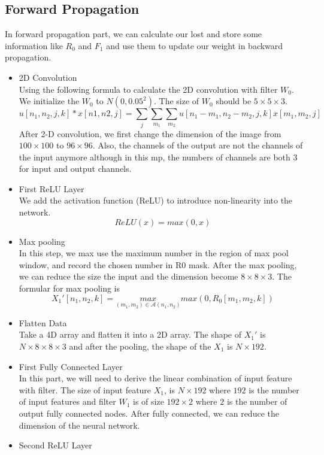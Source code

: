 \documentclass[12pt]{article}
\begin{document}
	\subsection*{Forward Propagation}
		In forward propagation part, we can calculate our lost and store some information like $R_0$ and $F_1$ and use them to update our weight in backward propagation.
		\begin{itemize}
  		\item 2D Convolution \\
			Using the following formula to calculate the 2D convolution with filter $W_0$. We initialize the $W_0$ to $N(0, 0.05^2)$. The size of $W_0$ should be $5 \times 5 \times 3$.
			$$u[n_1, n_2, j, k]*x[n1, n2, j] = \sum_j \sum_{m_1} \sum_{m_2} u[n_1-m_1, n_2-m_2, j, k]x[m_1, m_2, j]$$
			After 2-D convolution, we first change the dimension of the image from $100 \times 100$ to $96 \times 96$. Also, the channels of the output are not the channels of the input anymore although in this mp, the numbers of channels are both 3 for input and output channels.
  		\item First ReLU Layer \\
			We add the activation function (ReLU) to introduce non-linearity into the network.
			$$ReLU(x) = max(0, x)$$
			\item Max pooling \\
			In this step, we max use the maximum number in the region of max pool window, and record the chosen number in R0 mask. After the max pooling, we can reduce the size the input and the dimension become $8 \times 8 \times 3$. The formular for max pooling is
			$$X_1'[n_1, n_2, k] = \underset{(m_1, m_2) \in \mathcal{A}(n_1, n_2)}{max} max(0, R_0[m_1, m_2, k])$$
			\item Flatten Data \\
			Take a 4D array and flatten it into a 2D array. The shape of $X_1'$ is $N \times 8 \times 8 \times 3$ and after the pooling, the shape of the $X_1$ is $N \times 192$.
			\item First Fully Connected Layer \\
			In this part, we will need to derive the linear combination of input feature with filter. The size of input feature $X_1$, is $N \times 192$ where $192$ is the number of input features and filter $W_1$ is of size $ 192 \times 2$ where $2$ is the number of output fully connected nodes. After fully connected, we can reduce the dimension of the neural network.
			\item Second ReLU Layer \\

\end{itemize}
\end{document}
